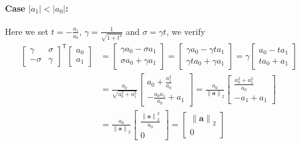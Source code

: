 \documentclass{article}
\begin{document}
\paragraph{Case $\left\lvert a_{1}\right\rvert < \left\lvert a_{0}\right\rvert$:} Here we set $t = -\frac{a_{1}}{a_{0}}$, $\gamma = \frac{1}{\sqrt{1 + t^{2}}}$ and $\sigma = \gamma t$, we verify
\begin{align*}
    \begin{bmatrix}
    \gamma & \sigma \\
    -\sigma & \gamma
    \end{bmatrix}^{\mathsf{T}}\begin{bmatrix}
        a_{0} \\ a_{1}
    \end{bmatrix} &= \begin{bmatrix}
        \gamma a_{0} - \sigma a_{1} \\
        \sigma a_{0} + \gamma a_{1}
    \end{bmatrix} =
    \begin{bmatrix}
        \gamma a_{0} - \gamma t a_{1} \\
        \gamma t a_{0} + \gamma a_{1}
    \end{bmatrix} =\gamma \begin{bmatrix}
        a_{0} - t a_{1} \\
        ta_{0} + a_{1}
    \end{bmatrix} \\ &= 
    \frac{a_{0}}{\sqrt{a_{0}^{2} + a_{1}^{2}}}
    \begin{bmatrix}
        a_{0} + \frac{a_{1}^{2}}{a_{0}}  \\
        -\frac{a_{0}a_{1}}{a_{0}} + a_{1}
    \end{bmatrix} =
    \frac{a_{0}}{\left\lVert \mathbf{a}\right\rVert_{2}} \begin{bmatrix}
 \frac{a_{0}^{2} + a_{1}^{2}}{a_{0}}  \\
        -a_{1} + a_{1}
    \end{bmatrix} \\
    &= \frac{a_{0}}{\left\lVert \mathbf{a}\right\rVert_{2}} \begin{bmatrix}
 \frac{\left\lVert \mathbf{a}\right\rVert_{2}^{2}}{a_{0}}  \\
        0
    \end{bmatrix} = \begin{bmatrix}
        \left\lVert \mathbf{a}\right\rVert_{2} \\ 0
    \end{bmatrix}
\end{align*}
\end{document}
